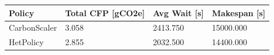 \begin{tabular}{llll}
\toprule
Policy & Total CFP [gCO2e] & Avg Wait [s] & Makespan [s] \\
\midrule
CarbonScaler & 3.058 & 2413.750 & 15000.000 \\
HetPolicy & 2.855 & 2032.500 & 14400.000 \\
\bottomrule
\end{tabular}
